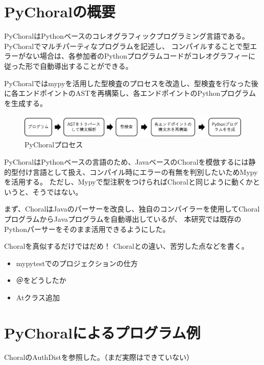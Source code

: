 \documentclass{thesis}
\begin{document}
\section{PyChoralの概要}
PyChoralはPythonベースのコレオグラフィックプログラミング言語である。PyChoralでマルチパーティなプログラムを記述し、
コンパイルすることで型エラーがない場合は、各参加者のPythonプログラムコードがコレオグラフィーに従った形で自動導出することができる。

PyChoralではmypyを活用した型検査のプロセスを改造し、型検査を行なった後に各エンドポイントのASTを再構築し、各エンドポイントのPythonプログラムを生成する。
\begin{figure}[H]
  \centering
  \includegraphics[scale=0.5]{image/pychoralprocess.png}
  \caption{PyChoralプロセス}
\end{figure}
PyChoralはPythonベースの言語のため、JavaベースのChoralを模倣するには静的型付け言語として扱え、コンパイル時にエラーの有無を判別したいためMypyを活用する。
ただし、Mypyで型注釈をつけらればChoralと同じように動くかというと、そうではない。

まず、ChoralはJavaのパーサーを改良し、独自のコンパイラーを使用してChoralプログラムからJavaプログラムを自動導出しているが、
本研究では既存のPythonパーサーをそのまま活用できるようにした。

Choralを真似するだけではだめ！ Choralとの違い、苦労した点などを書く。
\begin{itemize}
  \item mypytestでのプロジェクションの仕方
  \item ＠をどうしたか
  \item Atクラス追加
\end{itemize}

\section{PyChoralによるプログラム例}
ChoralのAuthDistを参照した。（まだ実際はできていない）
\end{document}
